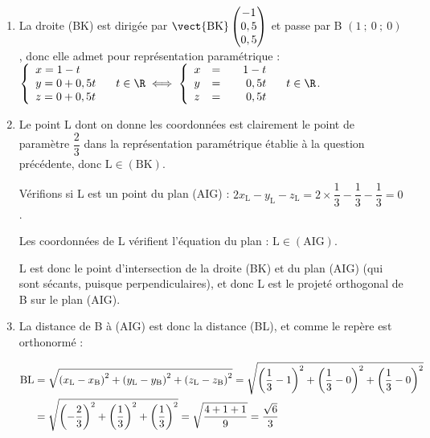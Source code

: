\begin{enumerate}
$\aligned[t]  2x_\mathrm{A} - y_\mathrm{A} - z_\mathrm{A} + d=0 &\iff 2\times 0 - 0 - 0 + d = 0\\&\iff d =0\endaligned$

Finalement, une équation du plan (AIG) est donc bien $2x-y-z = 0$.

\item La droite (BK) est dirigée par $ \vect{\mathrm{BK}} \begin{pmatrix} -1\\0,5\\0,5 \end{pmatrix}$ et passe par B $ (1~;~0~;~0)$, donc elle admet pour représentation paramétrique :
\quad
$ \left\{\begin{array}{l} x = 1 - t\\y = 0 + 0,5t\\z = 0 + 0,5t  \end{array}\right. \quad t \in \R \iff \left\{\begin{array}{l c r} x &=& 1 - t\\y &=&\phantom{1 -}0,5t\\z &=&\phantom{1 -}0,5t \end{array}\right. \quad t \in \R$.

\item Le point L dont on donne les coordonnées est clairement le point de paramètre $ \dfrac{2}{3} $ dans la représentation paramétrique établie à la question précédente, donc $\mathrm{L} \in (\mathrm{BK})$.

Vérifions si L est un point du plan (AIG) : $2x_\mathrm{L} - y_\mathrm{L} -z_\mathrm{L} = 2\times \dfrac{1}{3} - \dfrac{1}{3} - \dfrac{1}{3} = 0$.

Les coordonnées de L vérifient l'équation du plan : $\mathrm{L} \in (\mathrm{AIG})$.

L est donc le point d'intersection de la droite (BK) et du plan (AIG) (qui sont sécants, puisque perpendiculaires), et donc L est le projeté orthogonal de B sur le plan (AIG).

\item La distance de B à (AIG) est donc la distance (BL), et comme le repère est orthonormé :

$\aligned[t] \mathrm{BL} &= \sqrt{\left(x_\mathrm{L} - x_\mathrm{B}\right)^2+\left(y_\mathrm{L} - y_\mathrm{B}\right)^2+\left(z_\mathrm{L} - z_\mathrm{B}\right)^2 }
			 = \sqrt{\left(\dfrac{1}{3}-1\right)^2+\left(\dfrac{1}{3}-0\right)^2+\left(\dfrac{1}{3}-0\right)^2 }\\
			 &=  \sqrt{\left(-\dfrac{2}{3}\right)^2+\left(\dfrac{1}{3}\right)^2+\left(\dfrac{1}{3}\right)^2 } = \sqrt{\dfrac{4 + 1 + 1}{9}} = \dfrac{\sqrt{6}}{3}\endaligned$
		\end{enumerate}

